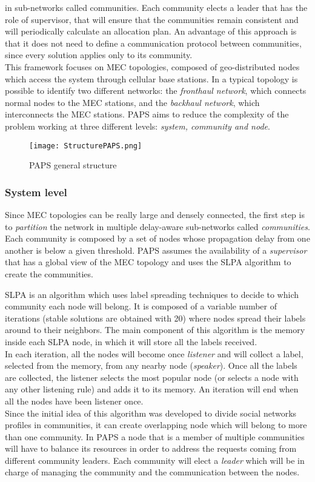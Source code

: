 in sub-networks called communities. Each community elects a leader that has the role of supervisor, that
will ensure that the communities remain consistent and will periodically calculate an allocation plan.
An advantage of this approach is that it does not need to define a communication protocol between communities,
since every solution applies only to its community.
\\
This framework focuses on MEC topologies, composed of geo-distributed nodes which access
the system through cellular base stations. In a typical topology is possible to identify
two different networks: the \textit{fronthaul network}, which connects normal nodes to 
the MEC stations, and the \textit{backhaul network}, which interconnects the MEC stations.
PAPS aims to reduce the complexity of the problem working at three different levels: 
\textit{system, community and node}. 
\\
\begin{figure}[h]
    \texttt{[image: StructurePAPS.png]}
    \label{fig:structure}
    \caption{PAPS general structure}
\end{figure}

\subsubsection*{System level}
Since MEC topologies can be really large and densely connected, the first step is to \textit{partition}
the network in multiple delay-aware sub-networks called \textit{communities}. Each community
is composed by a set of nodes whose propagation delay from one another is below a given 
threshold. PAPS assumes the availability of a \textit{supervisor} that has a global view of
the MEC topology and uses the SLPA \cite{SLPA} algorithm to create the communities.
\par
SLPA is an algorithm which uses label spreading techniques to decide to which community each node will belong.
It is composed of a variable number of iterations (stable solutions are obtained with 20) where nodes spread their labels 
around to their neighbors.
The main component of this  algorithm is the memory inside each SLPA node, in which it will store all the labels received.
\\
In each iteration, all the nodes will become once 
\textit{listener} and will collect a label, selected from the memory, from any nearby 
node (\textit{speaker}). Once all the labels are collected, the listener selects the 
most popular node (or selects a node with any other listening rule) and adds it to its
memory.
An iteration will end when all the nodes have been listener once. \\
Since the initial idea of this 
algorithm was developed to divide social networks profiles in communities, it can create 
overlapping node which will belong to more than one community. 
In PAPS a node that is a member of multiple communities will have to balance its resources in order to address
the requests coming from different community leaders.
Each community will
elect a \textit{leader} which will be in charge of managing the community and the communication
between the nodes.

